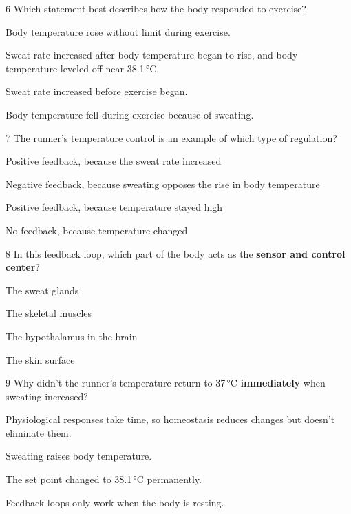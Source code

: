 \documentclass[11pt,letterpaper]{article}
\begin{document}

\begin{mcq}{6}
Which statement best describes how the body responded to exercise?
\begin{choices}
  \item Body temperature rose without limit during exercise.
  \item Sweat rate increased after body temperature began to rise, and body temperature leveled off near 38.1\,°C.
  \item Sweat rate increased before exercise began.
  \item Body temperature fell during exercise because of sweating.
\end{choices}
\end{mcq}

\begin{mcq}{7}
The runner's temperature control is an example of which type of regulation?
\begin{choices}
  \item Positive feedback, because the sweat rate increased
  \item Negative feedback, because sweating opposes the rise in body temperature
  \item Positive feedback, because temperature stayed high
  \item No feedback, because temperature changed
\end{choices}
\end{mcq}

\begin{mcq}{8}
In this feedback loop, which part of the body acts as the \textbf{sensor and control center}?
\begin{choices}
  \item The sweat glands
  \item The skeletal muscles
  \item The hypothalamus in the brain
  \item The skin surface
\end{choices}
\end{mcq}

\begin{mcq}{9}
Why didn't the runner's temperature return to 37\,°C \textbf{immediately} when sweating increased?
\begin{choices}
  \item Physiological responses take time, so homeostasis reduces changes but doesn't eliminate them.
  \item Sweating raises body temperature.
  \item The set point changed to 38.1\,°C permanently.
  \item Feedback loops only work when the body is resting.
\end{choices}
\end{mcq}
\end{document}
